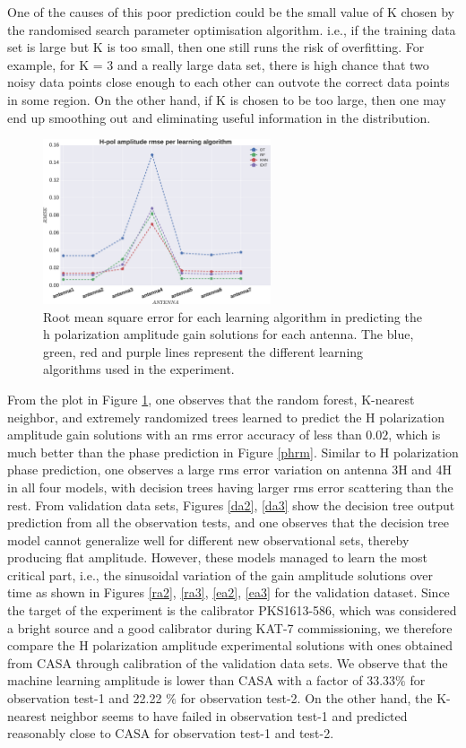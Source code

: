One of the causes of this poor prediction could be the small value of K chosen by the randomised search parameter optimisation algorithm. i.e., if the training data set is large but K is too small, then one still runs the risk of overfitting. For example, for K = 3 and a really large data set, there is high  chance that two noisy data points close enough to each other can outvote the correct data points in some region. On the other hand, if K is chosen to be too large, then one may end up smoothing out and eliminating useful  information in the distribution. 
\begin{figure}[H]
  \centering
    \includegraphics[width=0.6\textwidth]{images/Hpol-amp.eps}
    \caption{Root mean square error for each learning algorithm in predicting the h polarization amplitude gain solutions for each antenna. The blue, green, red and purple lines represent the different learning algorithms used in the experiment.}
  \label{amprm}
 \end{figure} 

From the plot in Figure \ref{amprm}, one observes that the random forest, K-nearest neighbor, and extremely randomized trees learned to predict the H polarization amplitude gain solutions with an rms error accuracy of less than $0.02$, which is much better than the phase prediction in Figure \ref{phrm}. Similar to H polarization phase prediction, one observes a large rms error variation on antenna 3H and 4H in all four models, with decision trees having larger rms error scattering than the rest. From validation data sets, Figures \ref{da2}, \ref{da3} show the decision tree output prediction from all the observation tests, and one observes that the decision tree model cannot generalize well for different new observational sets, thereby producing flat amplitude. However, these models managed to learn the most critical part, i.e., the sinusoidal variation of the gain amplitude solutions over time as shown in Figures \ref{ra2}, \ref{ra3}, \ref{ea2}, \ref{ea3} for the validation dataset. Since the target of the experiment is the calibrator PKS1613-586, which was considered a bright source and a good calibrator during KAT-7 commissioning, we therefore compare the H polarization amplitude experimental solutions with ones obtained from CASA through calibration of the validation data sets. We observe that the machine learning amplitude is lower than CASA with a factor of 33.33$\%$ for observation test-1 and 22.22 $\%$ for observation test-2. On the other hand, the K-nearest neighbor seems to have failed in observation test-1 and predicted reasonably close to CASA for observation test-1 and test-2.

